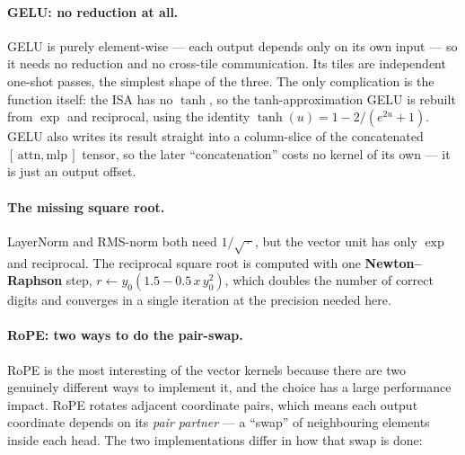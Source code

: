 \documentclass[11pt]{report}
\begin{document}
\paragraph{GELU: no reduction at all.} GELU is purely element-wise --- each
output depends only on its own input --- so it needs no reduction and no
cross-tile communication. Its tiles are independent one-shot passes, the
simplest shape of the three. The only complication is the function itself:
the ISA has no $\tanh$, so the tanh-approximation GELU is rebuilt from
$\exp$ and reciprocal, using the identity $\tanh(u)=1-2/(e^{2u}+1)$. GELU
also writes its result straight into a column-slice of the concatenated
$[\,\text{attn},\text{mlp}\,]$ tensor, so the later ``concatenation'' costs
no kernel of its own --- it is just an output offset.

\begin{algorithm}[H]
\DontPrintSemicolon
{}
\caption{GELU (tanh approximation): element-wise, no reduction}
\end{algorithm}

\paragraph{The missing square root.} LayerNorm and RMS-norm both need
$1/\sqrt{\,\cdot\,}$, but the vector unit has only $\exp$ and reciprocal.
The reciprocal square root is computed with one \textbf{Newton--Raphson}
step, $r \leftarrow y_0(1.5 - 0.5\,x\,y_0^2)$, which doubles the number of
correct digits and converges in a single iteration at the precision needed
here.

\paragraph{RoPE: two ways to do the pair-swap.} RoPE is the most
interesting of the vector kernels because there are two genuinely different
ways to implement it, and the choice has a large performance impact. RoPE
rotates adjacent coordinate pairs, which means each output coordinate
depends on its \emph{pair partner} --- a ``swap'' of neighbouring elements
inside each head. The two implementations differ in how that swap is done:
\end{document}
